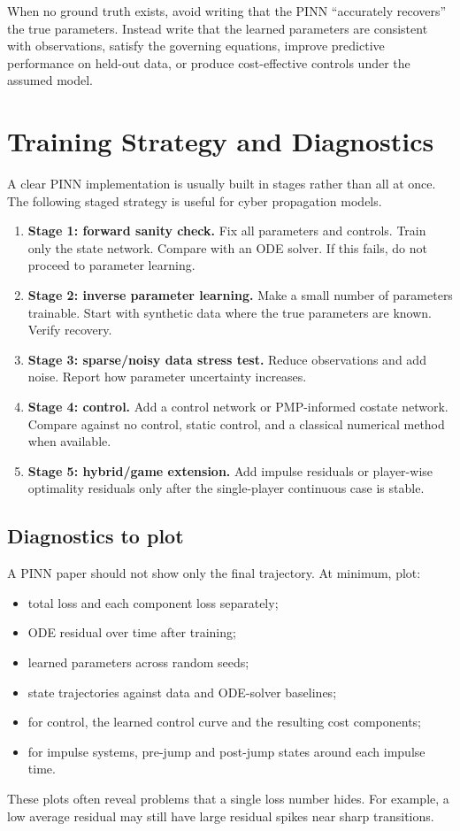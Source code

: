 \documentclass[11pt,a4paper]{article}
\begin{document}
\begin{warningbox}
When no ground truth exists, avoid writing that the PINN ``accurately recovers'' the true parameters. Instead write that the learned parameters are consistent with observations, satisfy the governing equations, improve predictive performance on held-out data, or produce cost-effective controls under the assumed model.
\end{warningbox}

\section{Training Strategy and Diagnostics}

A clear PINN implementation is usually built in stages rather than all at once. The following staged strategy is useful for cyber propagation models.

\begin{enumerate}[leftmargin=2em]
    \item \textbf{Stage 1: forward sanity check.} Fix all parameters and controls. Train only the state network. Compare with an ODE solver. If this fails, do not proceed to parameter learning.
    \item \textbf{Stage 2: inverse parameter learning.} Make a small number of parameters trainable. Start with synthetic data where the true parameters are known. Verify recovery.
    \item \textbf{Stage 3: sparse/noisy data stress test.} Reduce observations and add noise. Report how parameter uncertainty increases.
    \item \textbf{Stage 4: control.} Add a control network or PMP-informed costate network. Compare against no control, static control, and a classical numerical method when available.
    \item \textbf{Stage 5: hybrid/game extension.} Add impulse residuals or player-wise optimality residuals only after the single-player continuous case is stable.
\end{enumerate}

\subsection{Diagnostics to plot}
A PINN paper should not show only the final trajectory. At minimum, plot:
\begin{itemize}[leftmargin=2em]
    \item total loss and each component loss separately;
    \item ODE residual over time after training;
    \item learned parameters across random seeds;
    \item state trajectories against data and ODE-solver baselines;
    \item for control, the learned control curve and the resulting cost components;
    \item for impulse systems, pre-jump and post-jump states around each impulse time.
\end{itemize}
These plots often reveal problems that a single loss number hides. For example, a low average residual may still have large residual spikes near sharp transitions.
\end{document}
